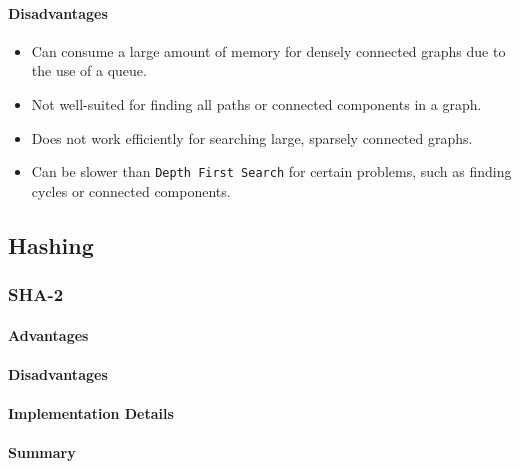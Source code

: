 \paragraph{Disadvantages}
\begin{itemize}
    \item Can consume a large amount of memory for densely connected graphs due to the use of a queue.
    \item Not well-suited for finding all paths or connected components in a graph.
    \item Does not work efficiently for searching large, sparsely connected graphs.
    \item Can be slower than \lstinline{Depth First Search} for certain problems, such as finding cycles or connected components.
\end{itemize}


\subsection{Hashing}


\subsubsection{SHA-2}

\paragraph{Advantages}
\paragraph{Disadvantages}

\paragraph{Implementation Details}

\paragraph{Summary}


